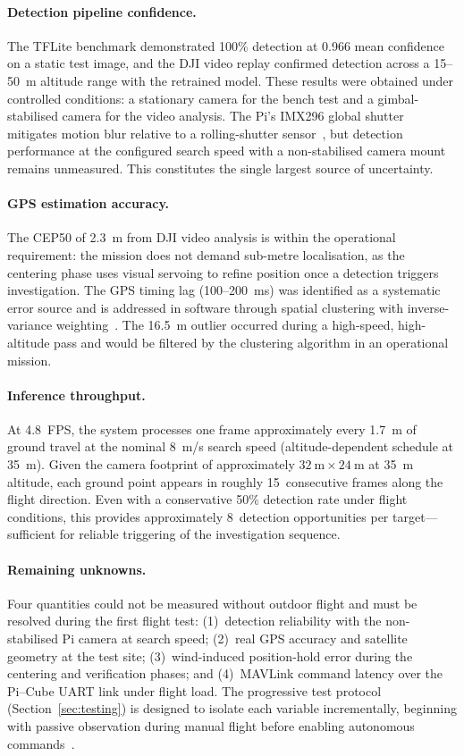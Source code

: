 \paragraph{Detection pipeline confidence.} The TFLite benchmark demonstrated 100\% detection at 0.966 mean confidence on a static test image, and the DJI video replay confirmed detection across a 15--50~m altitude range with the retrained model. These results were obtained under controlled conditions: a stationary camera for the bench test and a gimbal-stabilised camera for the video analysis. The Pi's IMX296 global shutter mitigates motion blur relative to a rolling-shutter sensor~\cite{imx296}, but detection performance at the configured search speed with a non-stabilised camera mount remains unmeasured. This constitutes the single largest source of uncertainty.

\paragraph{GPS estimation accuracy.} The CEP50 of 2.3~m from DJI video analysis is within the operational requirement: the mission does not demand sub-metre localisation, as the centering phase uses visual servoing to refine position once a detection triggers investigation. The GPS timing lag (100--200~ms) was identified as a systematic error source and is addressed in software through spatial clustering with inverse-variance weighting~\cite{kalman1960}. The 16.5~m outlier occurred during a high-speed, high-altitude pass and would be filtered by the clustering algorithm in an operational mission.

\paragraph{Inference throughput.} At 4.8~FPS, the system processes one frame approximately every 1.7~m of ground travel at the nominal 8~m/s search speed (altitude-dependent schedule at 35~m). Given the camera footprint of approximately $32~\text{m} \times 24~\text{m}$ at 35~m altitude, each ground point appears in roughly 15~consecutive frames along the flight direction. Even with a conservative 50\% detection rate under flight conditions, this provides approximately 8~detection opportunities per target---sufficient for reliable triggering of the investigation sequence.

\paragraph{Remaining unknowns.} Four quantities could not be measured without outdoor flight and must be resolved during the first flight test: (1)~detection reliability with the non-stabilised Pi camera at search speed; (2)~real GPS accuracy and satellite geometry at the test site; (3)~wind-induced position-hold error during the centering and verification phases; and (4)~MAVLink command latency over the Pi--Cube UART link under flight load. The progressive test protocol (Section~\ref{sec:testing}) is designed to isolate each variable incrementally, beginning with passive observation during manual flight before enabling autonomous commands~\cite{koopman2016challenges}.
